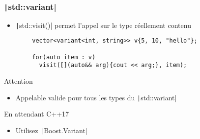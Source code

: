 \documentclass[C++.tex]{subfiles}
\begin{document}
\begin{frame}[fragile]
	\frametitle{\texttt|std::variant|}
	\begin{itemize}
		\item \texttt|std::visit()| permet l'appel sur le type réellement contenu
	\end{itemize}

	\begin{verbatim}
		vector<variant<int, string>> v{5, 10, "hello"};

		for(auto item : v)
		  visit([](auto&& arg){cout << arg;}, item);
  	\end{verbatim}

	\begin{alertblock}{Attention}
		\begin{itemize}
			\item Appelable valide pour tous les types du \texttt|std::variant|
		\end{itemize}

	\end{alertblock}

	\begin{block}{En attendant C++17}
		\begin{itemize}
			\item Utilisez \texttt|Boost.Variant|
		\end{itemize}
	\end{block}


\end{frame}
\end{document}
